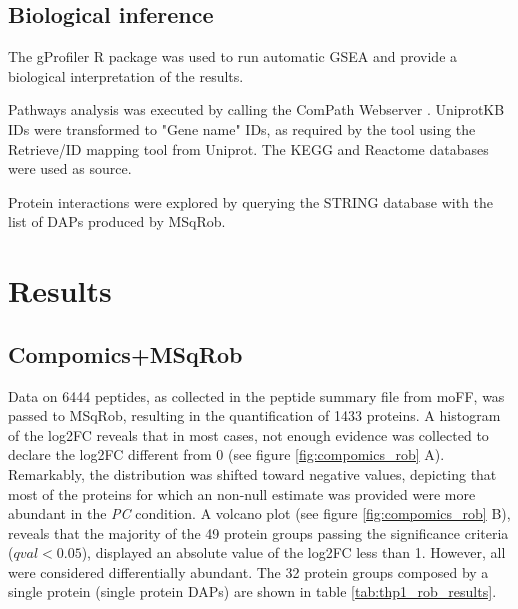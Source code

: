\subsection{Biological inference}

The gProfiler R package \cite{Boyd2010} was used to run automatic \ac{GSEA} and provide a biological interpretation of the results.

Pathways analysis was executed by calling the ComPath Webserver \cite{Domingo2018}. UniprotKB IDs were transformed to "Gene name" IDs, as required by the tool using the Retrieve/ID mapping tool from Uniprot. The KEGG \cite{Kanehisa2000} and Reactome \cite{Croft2014} databases were used as source.

Protein interactions were explored by querying the STRING database \cite{Szklarczyk2017} with the list of \ac{DAP}s produced by MSqRob.
 
\section{Results}

\subsection{Compomics+MSqRob}

Data on 6444 peptides, as collected in the peptide summary file from moFF, was passed to MSqRob, resulting in the quantification of 1433 proteins. A histogram of the \ac{log2FC} reveals that in most cases, not enough evidence was collected to declare the \ac{log2FC} different from 0 (see figure \ref{fig:compomics_rob} A). Remarkably, the distribution was shifted toward negative values, depicting that most of the proteins for which an non-null estimate was provided were more abundant in the \textit{PC} condition. A volcano plot (see figure \ref{fig:compomics_rob} B), reveals that the majority of the 49 protein groups passing the significance criteria ($qval < 0.05$), displayed an absolute value of the \ac{log2FC} less than 1. However, all were considered differentially abundant. The 32 protein groups composed by a single protein (single protein \ac{DAP}s) are shown in table \ref{tab:thp1_rob_results}.

